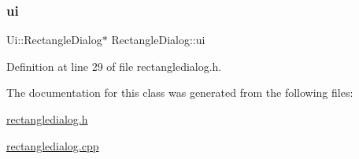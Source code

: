 \subsubsection{\texorpdfstring{ui}{ui}}
{\footnotesize\ttfamily Ui\+::\+Rectangle\+Dialog$\ast$ Rectangle\+Dialog\+::ui\hspace{0.3cm}{\ttfamily [private]}}



Definition at line 29 of file rectangledialog.\+h.



The documentation for this class was generated from the following files\+:\begin{DoxyCompactItemize}
\item 
\mbox{\hyperlink{rectangledialog_8h}{rectangledialog.\+h}}\item 
\mbox{\hyperlink{rectangledialog_8cpp}{rectangledialog.\+cpp}}\end{DoxyCompactItemize}
